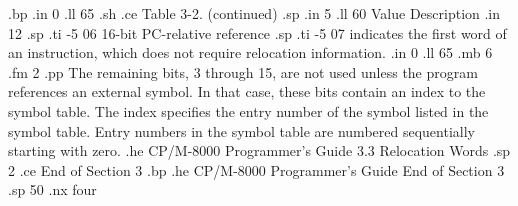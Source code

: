 .bp
.in 0
.ll 65
.sh
.ce
Table 3-2.  (continued)
.sp
.in 5
.ll 60
Value                     Description
.in 12
.sp
.ti -5
06   16-bit PC-relative reference
.sp
.ti -5
07   indicates the first word of an instruction, which does not 
require relocation information.
.in 0
.ll 65
.mb 6
.fm 2
.pp
The remaining bits, 3 through 15, are not used unless the program
references an external symbol.  In that case, these bits contain
an index to the symbol table.  The index specifies the entry
number of the symbol listed in the symbol table.  Entry numbers in the
symbol table are numbered sequentially starting with zero. 
.he CP/M-8000 Programmer's Guide            3.3  Relocation Words
.sp 2
.ce
End of Section 3
.bp
.he CP/M-8000 Programmer's Guide               End of Section 3
.sp 50
.nx four


